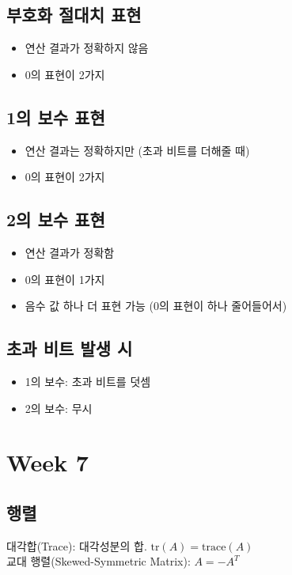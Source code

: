 \subsection{부호화 절대치 표현}
\begin{itemize}
    \item 연산 결과가 정확하지 않음
    \item 0의 표현이 2가지
\end{itemize}
\subsection{1의 보수 표현}
\begin{itemize}
    \item 연산 결과는 정확하지만 (초과 비트를 더해줄 때)
    \item 0의 표현이 2가지
\end{itemize}
\subsection{2의 보수 표현}
\begin{itemize}
    \item 연산 결과가 정확함
    \item 0의 표현이 1가지
    \item 음수 값 하나 더 표현 가능 (0의 표현이 하나 줄어들어서)
\end{itemize}
\subsection{초과 비트 발생 시}
\begin{itemize}
    \item 1의 보수: 초과 비트를 덧셈
    \item 2의 보수: 무시
\end{itemize}

\newpage
\section{Week 7}
\subsection{행렬}
대각합(Trace): 대각성분의 합. $\mathrm{tr}(A) = \mathrm{trace}(A)$\\
교대 행렬(Skewed-Symmetric Matrix): $A=-A^T$

